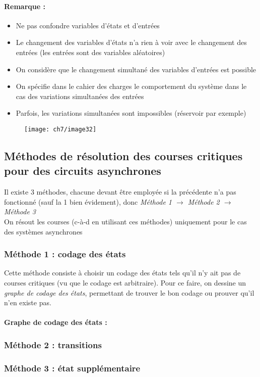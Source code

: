 \paragraph{Remarque :} 
\begin{itemize}
	\item Ne pas confondre variables d'états et d'entrées
	\item Le changement des variables d'états n'a rien à voir avec le changement des entrées (les entrées sont des variables aléatoires)
	\item On considère que le changement simultané des variables d'entrées est possible
	\item On spécifie dans le cahier des charges le comportement du système dans le cas des variations simultanées des entrées
	\item Parfois, les variations simultanées sont impossibles (réservoir par exemple)
\end{itemize}
\begin{figure}[H]
	\centering
	\texttt{[image: ch7/image32]}
\end{figure}
\subsection{Méthodes de résolution des courses critiques pour des circuits asynchrones}
Il existe 3 méthodes, chacune devant être employée si la précédente n'a pas fonctionné (sauf la 1 bien évidement), donc \emph{Méthode 1 $\rightarrow$ Méthode 2 $\rightarrow$ Méthode 3}\\
\danger On résout les courses (c-à-d en utilisant ces méthodes) uniquement pour le cas des systèmes asynchrones
\subsubsection{Méthode 1 : codage des états}
Cette méthode consiste à choisir un codage des états tels qu'il n'y ait pas de courses critiques (vu que le codage est arbitraire). Pour ce faire, on dessine un \emph{graphe de codage des états}, permettant de trouver le bon codage ou prouver qu'il n'en existe pas.
\paragraph{Graphe de codage des états :} 
\subsubsection{Méthode 2 : transitions}

\subsubsection{Méthode 3 : état supplémentaire}